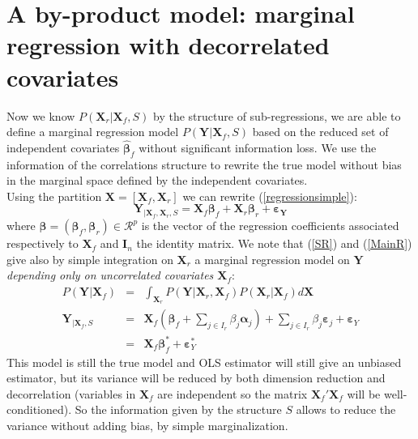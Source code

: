 \documentclass[11pt,a4paper]{report}
\begin{document}
\section{A by-product model: marginal regression with decorrelated covariates}
Now we know $P(\boldsymbol{X}_r|\boldsymbol{X}_f,S)$ by the structure of sub-regressions, we are able to define a marginal regression model $P(\boldsymbol{Y}|\boldsymbol{X}_f,S)$ based on the reduced set of independent covariates $\hat{\boldsymbol{\beta}}_f$ without significant information loss. We use the information of the correlations structure to rewrite the true model without bias in the marginal space defined by the independent covariates.
 	\\
Using the partition $\boldsymbol{X}=[\boldsymbol{X}_f,\boldsymbol{X}_r]$ we can rewrite (\ref{regressionsimple}):
	\begin{equation}
			\boldsymbol{Y}_{|\boldsymbol{X}_f,\boldsymbol{X}_r,S}=\boldsymbol{X}_f\boldsymbol{\beta}_f+\boldsymbol{X}_r\boldsymbol{\beta}_r+\boldsymbol{\varepsilon_Y} \label{MainR}
		\end{equation}
		where $\boldsymbol{\beta}=(\boldsymbol{\beta}_f,\boldsymbol{\beta}_r) \in  \mathcal{R}^p$ is the vector of the regression coefficients associated respectively to $\boldsymbol{X}_f$ and $\boldsymbol{I}_n$ the identity matrix. 
We note that (\ref{SR}) and (\ref{MainR}) give also by simple integration on $\boldsymbol{X}_r$ a marginal regression model on $\boldsymbol{Y}$ {\it depending only on uncorrelated covariates $\boldsymbol{X}_f$}:
\begin{eqnarray}
		P(\boldsymbol{Y}|\boldsymbol{X}_f)&=& \int_{\boldsymbol{X}_r}P(\boldsymbol{Y}|\boldsymbol{X}_r,\boldsymbol{X}_f)P(\boldsymbol{X}_r|\boldsymbol{X}_f) d \boldsymbol{X} \\
	\boldsymbol{Y}_{|\boldsymbol{X}_f,S}&=&\boldsymbol{X}_f (\boldsymbol{\beta}_f+ \sum_{j \in I_r}\beta_{j}\boldsymbol{\alpha}_j)+  \sum_{j \in I_r}\beta_{j}\boldsymbol{\varepsilon}_j+\boldsymbol{\varepsilon}_Y \label{Trueexpl} \\
	&=&\boldsymbol{X}_f\boldsymbol{\beta}_f^*+\boldsymbol{\varepsilon}_Y^*\label{modexpl}
\end{eqnarray}
 This model is still the true model and OLS estimator will still give an unbiased estimator, but its variance will be reduced by both dimension reduction and decorrelation (variables in $\boldsymbol{X}_f$ are independent so the matrix $\boldsymbol{X}_f'\boldsymbol{X}_f$ will be well-conditioned). So the information given by the structure $S$ allows to reduce the variance without adding bias, by simple marginalization.
\end{document}
